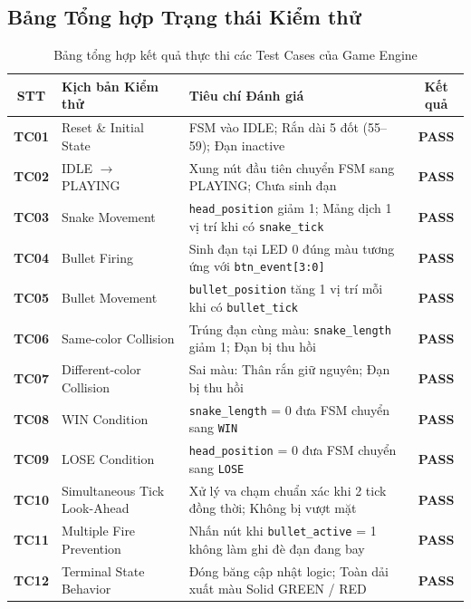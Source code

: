 \documentclass[12pt,a4paper]{article}
\begin{document}
\subsection{Bảng Tổng hợp Trạng thái Kiểm thử}
\begin{table}[H]
\centering
\caption{Bảng tổng hợp kết quả thực thi các Test Cases của Game Engine}
\label{tab:ge_summary}
\begin{tabular}{|c|l|p{7.5cm}|c|}
\hline
\textbf{STT} & \textbf{Kịch bản Kiểm thử} & \textbf{Tiêu chí Đánh giá} & \textbf{Kết quả} \\ \hline
\textbf{TC01} & Reset \& Initial State & FSM vào IDLE; Rắn dài 5 đốt (55--59); Đạn inactive & \textbf{PASS} \\ \hline
\textbf{TC02} & IDLE $\rightarrow$ PLAYING & Xung nút đầu tiên chuyển FSM sang PLAYING; Chưa sinh đạn & \textbf{PASS} \\ \hline
\textbf{TC03} & Snake Movement & \texttt{head\_position} giảm 1; Mảng dịch 1 vị trí khi có \texttt{snake\_tick} & \textbf{PASS} \\ \hline
\textbf{TC04} & Bullet Firing & Sinh đạn tại LED 0 đúng màu tương ứng với \texttt{btn\_event[3:0]} & \textbf{PASS} \\ \hline
\textbf{TC05} & Bullet Movement & \texttt{bullet\_position} tăng 1 vị trí mỗi khi có \texttt{bullet\_tick} & \textbf{PASS} \\ \hline
\textbf{TC06} & Same-color Collision & Trúng đạn cùng màu: \texttt{snake\_length} giảm 1; Đạn bị thu hồi & \textbf{PASS} \\ \hline
\textbf{TC07} & Different-color Collision & Sai màu: Thân rắn giữ nguyên; Đạn bị thu hồi & \textbf{PASS} \\ \hline
\textbf{TC08} & WIN Condition & \texttt{snake\_length} = 0 đưa FSM chuyển sang \texttt{WIN} & \textbf{PASS} \\ \hline
\textbf{TC09} & LOSE Condition & \texttt{head\_position} = 0 đưa FSM chuyển sang \texttt{LOSE} & \textbf{PASS} \\ \hline
\textbf{TC10} & Simultaneous Tick Look-Ahead & Xử lý va chạm chuẩn xác khi 2 tick đồng thời; Không bị vượt mặt & \textbf{PASS} \\ \hline
\textbf{TC11} & Multiple Fire Prevention & Nhấn nút khi \texttt{bullet\_active} = 1 không làm ghi đè đạn đang bay & \textbf{PASS} \\ \hline
\textbf{TC12} & Terminal State Behavior & Đóng băng cập nhật logic; Toàn dải xuất màu Solid GREEN / RED & \textbf{PASS} \\ \hline
\end{tabular}
\end{table}
\end{document}
